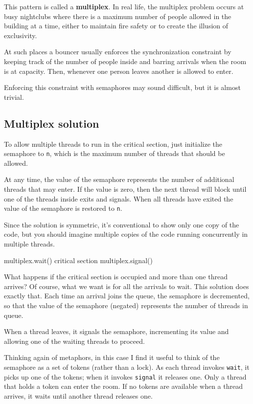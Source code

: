 \documentclass{book}
\begin{document}
This pattern is called a {\bf multiplex}.  In real life, the multiplex
problem occurs at busy nightclubs where there is a maximum number of
people allowed in the building at a time, either to maintain fire
safety or to create the illusion of exclusivity.

At such places a bouncer usually enforces the synchronization
constraint by keeping track of the number of people inside
and barring arrivals when the room is at capacity.  Then,
whenever one person leaves another is allowed to enter.

Enforcing this constraint with semaphores may sound difficult, but it
is almost trivial.



\subsection{Multiplex solution}

To allow multiple threads to run in the critical section, just
initialize the semaphore to {\tt n}, which is the maximum number
of threads that should be allowed.

At any time, the value of the semaphore represents the
number of additional threads that may enter.  If the value is zero,
then the next thread will block until one of the threads inside
exits and signals.  When all threads have exited the value of the
semaphore is restored to {\tt n}.

Since the solution is symmetric, it's conventional to show only one
copy of the code, but you should imagine multiple copies of the code
running concurrently in multiple threads.

\begin{unbreakable}[title={Multiplex solution}]{}
multiplex.wait()
    critical section 
multiplex.signal()      
\end{unbreakable}

What happens if the critical section is occupied and more than one
thread arrives?  Of course, what we want is for all the arrivals to
wait.  This solution does exactly that.  Each time an arrival joins
the queue, the semaphore is decremented, so that the value of the
semaphore (negated) represents the number of threads in queue.

When a thread leaves, it signals the semaphore, incrementing
its value and allowing one of the waiting threads to proceed.

Thinking again of metaphors, in this case I find it useful
to think of the semaphore as a set of tokens (rather than
a lock).
As each thread invokes {\tt wait}, it picks up one of
the tokens; when it invokes {\tt signal} it releases one.
Only a thread that holds a token can enter the room.  If no
tokens are available when a thread arrives, it waits until
another thread releases one.
\end{document}
